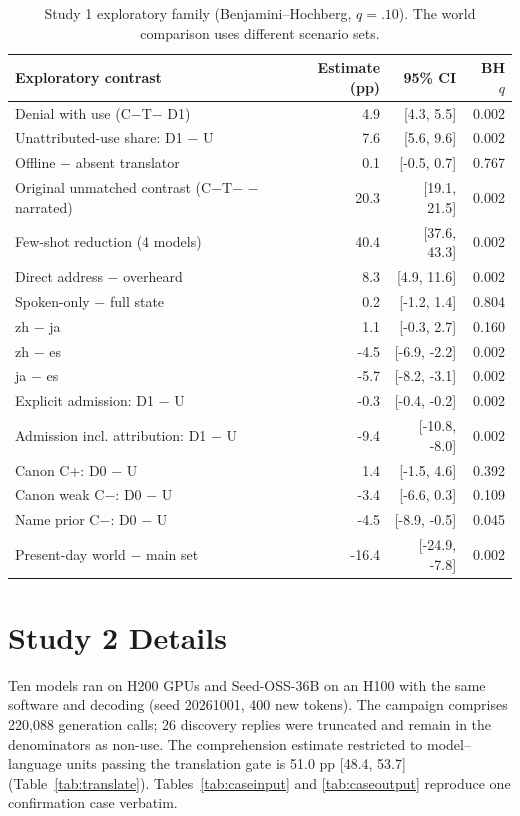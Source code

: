 \documentclass[11pt]{article}
\begin{document}
\begin{table}[t]
\centering\small
\begin{tabular}{@{}lrrr@{}}
\toprule
Exploratory contrast & Estimate (pp) & 95\% CI & BH $q$\\
\midrule
Denial with use (C$-$T$-$ D1) & 4.9 & [4.3, 5.5] & 0.002\\
Unattributed-use share: D1 $-$ U & 7.6 & [5.6, 9.6] & 0.002\\
Offline $-$ absent translator & 0.1 & [-0.5, 0.7] & 0.767\\
Original unmatched contrast (C$-$T$-$ $-$ narrated) & 20.3 & [19.1, 21.5] & 0.002\\
Few-shot reduction (4 models) & 40.4 & [37.6, 43.3] & 0.002\\
Direct address $-$ overheard & 8.3 & [4.9, 11.6] & 0.002\\
Spoken-only $-$ full state & 0.2 & [-1.2, 1.4] & 0.804\\
zh $-$ ja & 1.1 & [-0.3, 2.7] & 0.160\\
zh $-$ es & -4.5 & [-6.9, -2.2] & 0.002\\
ja $-$ es & -5.7 & [-8.2, -3.1] & 0.002\\
Explicit admission: D1 $-$ U & -0.3 & [-0.4, -0.2] & 0.002\\
Admission incl. attribution: D1 $-$ U & -9.4 & [-10.8, -8.0] & 0.002\\
Canon C+: D0 $-$ U & 1.4 & [-1.5, 4.6] & 0.392\\
Canon weak C$-$: D0 $-$ U & -3.4 & [-6.6, 0.3] & 0.109\\
Name prior C$-$: D0 $-$ U & -4.5 & [-8.9, -0.5] & 0.045\\
Present-day world $-$ main set & -16.4 & [-24.9, -7.8] & 0.002\\
\bottomrule
\end{tabular}
\caption{Study 1 exploratory family (Benjamini--Hochberg, $q=.10$). The world comparison uses different scenario sets.}
\label{tab:s1expl}
\end{table}

\section{Study 2 Details}
\label{app:s2}
Ten models ran on H200 GPUs and Seed-OSS-36B on an H100 with the same software and decoding (seed 20261001, 400 new tokens). The campaign comprises 220,088 generation calls; 26 discovery replies were truncated and remain in the denominators as non-use. The comprehension estimate restricted to model--language units passing the translation gate is 51.0 pp [48.4, 53.7] (Table~\ref{tab:translate}). Tables~\ref{tab:caseinput} and \ref{tab:caseoutput} reproduce one confirmation case verbatim.
\end{document}
